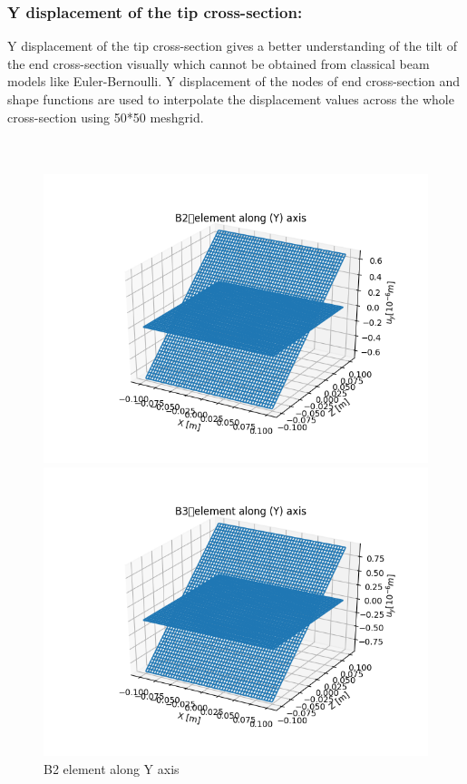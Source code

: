 \documentclass[a4paper,12pt]{article}
\begin{document}
\subsubsection*{Y displacement of the tip cross-section:}
\indent\indent\indent\indent Y displacement of the tip cross-section gives a better understanding of the tilt of the end cross-section visually which cannot be obtained from classical beam models like Euler-Bernoulli. Y displacement of the nodes of end cross-section and shape functions are used to interpolate the displacement values across the whole cross-section using 50*50 meshgrid. 
\\
\\
\\
\begin{figure}[!htbp]
  \centering
  \begin{minipage}[b]{0.45\textwidth}
    \includegraphics[width=\textwidth]{15.png}
    \caption{B2 element along Y axis}
    \label{fig: Y_B2}
  \end{minipage}
  \hfill
  \begin{minipage}[b]{0.45\textwidth}
    \includegraphics[width=\textwidth]{16.png}

\end{minipage}
\end{figure}
\end{document}
